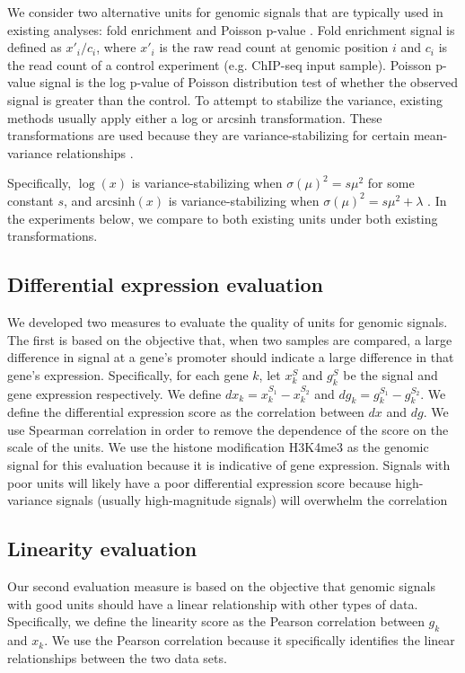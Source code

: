 \documentclass[11pt]{article}
\begin{document}
We consider two alternative units for genomic signals that are typically used in existing analyses: fold enrichment \cite{hoffman2012integrative} and Poisson p-value \cite{kundaje2015integrative}. 
Fold enrichment signal is defined as $x'_i / c_i$, where $x'_i$ is the raw read count at genomic position $i$ and $c_i$ is the read count of a control experiment (e.g. ChIP-seq input sample). 
Poisson p-value signal is the log p-value of Poisson distribution test of whether the observed signal is greater than the control. 
To attempt to stabilize the variance, existing methods usually apply either a log or arcsinh transformation.
These transformations are used because they are variance-stabilizing for certain mean-variance relationships \cite{bartlett1947use}. 

Specifically, $\log(x)$ is variance-stabilizing when $\sigma(\mu)^2 = s \mu^2$ for some constant $s$, and $\text{arcsinh}(x)$ is variance-stabilizing when $\sigma(\mu)^2 = s \mu^2 + \lambda$ \cite{box1953non}. 
In the experiments below, we compare to both existing units under both existing transformations.

\subsection{Differential expression evaluation}

We developed two measures to evaluate the quality of units for genomic signals.  
The first is based on the objective that, when two samples are compared, a large difference in  signal at a gene's promoter should indicate a large difference in that gene's expression.
Specifically, for each gene $k$, let $x_k^{S}$ and $g_k^S$ be the signal and gene expression respectively. 
We define $dx_k = x_k^{S_1} - x_k^{S_2}$ and $dg_k = g_k^{S_1} - g_k^{S_2}$. 
We define the differential expression score as the correlation between $dx$ and $dg$.
We use Spearman correlation in order to remove the dependence of the score on the scale of the units.
We use the histone modification H3K4me3 as the genomic signal for this evaluation because it is indicative of gene expression.  
Signals with poor units will likely have a poor differential expression score because high-variance signals (usually high-magnitude signals) will overwhelm the correlation


\subsection{Linearity evaluation}
Our second evaluation measure is based on the objective that genomic signals with good units  should have a linear relationship with other types of data.
Specifically, we define the linearity score as the Pearson correlation between $g_k$ and $x_k$.
We use the Pearson correlation because it specifically identifies the linear relationships between the two data sets. 
\end{document}
